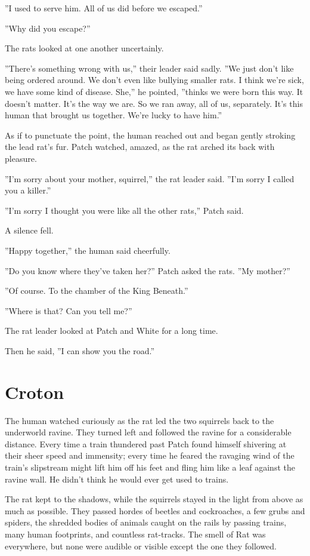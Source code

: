 \documentclass[12pt]{book}
\begin{document}
''I used to serve him. All of us did before we escaped.''

''Why did you escape?''

The rats looked at one another uncertainly.

''There's something wrong with us,'' their leader said sadly. ''We just don't like being ordered around. We don't even like bullying smaller rats. I think we're sick, we have some kind of disease. She,'' he pointed, ''thinks we were born this way. It doesn't matter. It's the way we are. So we ran away, all of us, separately. It's this human that brought us together. We're lucky to have him.''

As if to punctuate the point, the human reached out and began gently stroking the lead rat's fur. Patch watched, amazed, as the rat arched its back with pleasure.

''I'm sorry about your mother, squirrel,'' the rat leader said. ''I'm sorry I called you a killer.''

''I'm sorry I thought you were like all the other rats,'' Patch said.

A silence fell.

''Happy together,'' the human said cheerfully.

''Do you know where they've taken her?'' Patch asked the rats. ''My mother?''

''Of course. To the chamber of the King Beneath.''

''Where is that? Can you tell me?''

The rat leader looked at Patch and White for a long time.

Then he said, ''I can show you the road.''


\section{Croton}

The human watched curiously as the rat led the two squirrels back to the underworld ravine. They turned left and followed the ravine for a considerable distance. Every time a train thundered past Patch found himself shivering at their sheer speed and immensity; every time he feared the ravaging wind of the train's slipstream might lift him off his feet and fling him like a leaf against the ravine wall. He didn't think he would ever get used to trains.

The rat kept to the shadows, while the squirrels stayed in the light from above as much as possible. They passed hordes of beetles and cockroaches, a few grubs and spiders, the shredded bodies of animals caught on the rails by passing trains, many human footprints, and countless rat-tracks. The smell of Rat was everywhere, but none were audible or visible except the one they followed.
\end{document}
